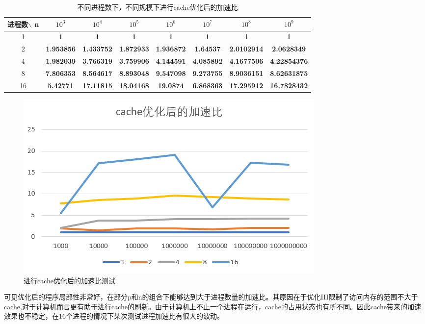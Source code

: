 \documentclass[a4paper,11pt,UTF8]{ctexart}
\begin{document}
\begin{table}[ht]
  \centering
  \caption{不同进程数下，不同规模下进行cache优化后的加速比}
  \begin{tabular}{cccccccc}
    \toprule
    进程数$\backslash$ n & $10^3$             & $10^4$            & $10^5$           & $10^6$          & $10^7$          & $10^8$         & $10^9$         \\\midrule
    1   & \textbf{1}       & \textbf{1}       & \textbf{1}       & \textbf{1}       & \textbf{1}        & \textbf{1}        & \textbf{1}         \\
    2  & \textbf{1.953856} & \textbf{1.433752} & \textbf{1.872933} & \textbf{1.936872} & \textbf{1.64537}  & \textbf{2.0102914} & \textbf{2.0628349}  \\
    4  & \textbf{1.982039} & \textbf{3.766319} & \textbf{3.759906} & \textbf{4.144591} & \textbf{4.085892} & \textbf{4.1677506} & \textbf{4.22854376} \\
    8  & \textbf{7.806353} & \textbf{8.564617} & \textbf{8.893048} & \textbf{9.547098} & \textbf{9.273755} & \textbf{8.9036151} & \textbf{8.62631875} \\
    16 & \textbf{5.42771}  & \textbf{17.11815} & \textbf{18.04168} & \textbf{19.0874}  & \textbf{6.868363} & \textbf{17.295912} & \textbf{16.7828432}\\\bottomrule
    \end{tabular}
  \label{label}
    \end{table}\newpage
  \begin {figure}[h]
  \centering %
  \includegraphics[width=\textwidth]{0628-041411.png}
  \caption{进行cache优化后的加速比测试} %
  \label{five}
  \end {figure}

  可见优化后的程序局部性非常好，在部分p和n的组合下能够达到大于进程数量的加速比。其原因在于优化III限制了访问内存的范围不大于cache,对于计算机而言更有助于进行cache的刷新。由于计算机上不止一个进程在运行，cache的占用状态也有所不同。因此cache带来的加速效果也不稳定，在16个进程的情况下某次测试进程加速比有很大的波动。
\end{document}
